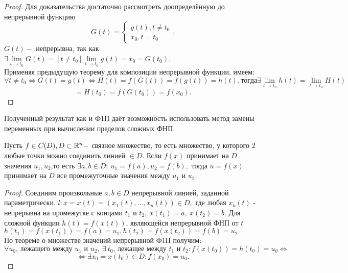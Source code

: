 \documentclass[../../main.tex]{subfiles}
\begin{document}
    \begin{proof}
    	Для доказательства достаточно рассмотреть доопределённую до непрерывной
    	функцию \begin{equation*}
    		G(t) = \begin{cases}
    			g(t), t \ne t_0\\
    			x_0, t = t_0 
    		\end{cases}.
    	\end{equation*} 
    $G(t) -$ непрерывна, так как $\exists \lim\limits_{t \to t_0} G(t) = 
    \left[ t \ne t_0 \right] \lim\limits_{t \to t_0} g(t) = x_0 = G(t_0)$.
    \\
    Применяя предыдущую теорему для композиции непрерывной функции, имеем:\\
    \[
      	\forall t \ne t_0 \iff G(t) = g(t) \iff H(t) = f(G(t)) = f(g(t)) = h(t),
      	тогда \exists \lim\limits_{t \to t_0} h(t) 
      	= \lim\limits_{t \to t_0} H(t) 
    \] 
    \[
   		= H(t_0) = f(G(t_0)) = f(x_0).
    \]
    \end{proof}
	Полученный результат как и Ф1П даёт возможность использовать метод замены
	переменных при вычислении пределов сложных ФНП.
	\begin{thm}
		Пусть $f \in C(D), D \subset \mathbb{R}^n - $ связное множество, то есть 
		множество, у которого 2 любые точки можно соединить линией  $\in D$.
		Если $f(x)$ принимает на $D$ значения $u_1, u_2$,то есть $\exists 
		a, b \in D: \ u_1 = f(a), u_2 = f(b),$ тогда $u = f(x)$ принимает
		на $D$ все промежуточные значения между $u_1$ и $u_2$.
	\end{thm}
	\begin{proof}
		Соединим произвольные $a, b \in D$ непрерывной линией, заданной 
		параметрически. $l: x = x(t) = (x_1(t), \ldots, x_n(t))\in D,$
		где любая $x_k(t) $ - непрерывна на промежутке с концами $t_1$ и $t_2,
		\ x(t_1) = a, \ x(t_2) = b$. Для сложной функции $h(t) = f(x(t))$, 
		являющейся непрерывной ФНП от $t$\\
		$h(t_1) = f(x(t_1)) = f(a) = u_1, h(t_2) = f(x(t_2)) = f(b) = u_2$\\
		По теореме о множестве значений непрерывной Ф1П получим:
		\[
		\forall u_0 \text{, лежащего между } u_1\text{ и } u_2 , \ \exists \ t_0
		\text{, лежащее между } t_1\text{ и } t_2 :f(x(t_0)) = h(t_0) = u_0 \iff
		\]
		\[
		\iff \exists x_0 = x(t_0) \in D : f(x_0) = u_0.
		\]
	\end{proof}
\end{document}
